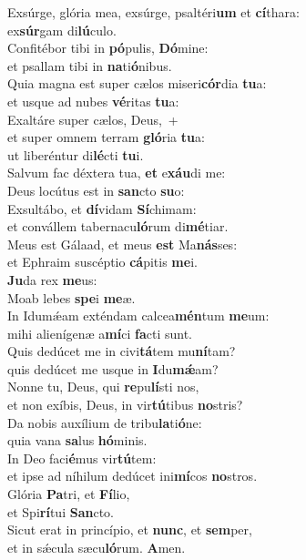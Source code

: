 \evenverse Exsúrge, glória mea, exsúrge, psaltéri\textbf{um} et \textbf{cí}thara:~\*\\
\evenverse ex\textbf{súr}gam di\textbf{lú}culo.\\
\oddverse Confitébor tibi in \textbf{pó}pulis, \textbf{Dó}mine:~\*\\
\oddverse et psallam tibi in \textbf{na}ti\textbf{ó}nibus.\\
\evenverse Quia magna est super cælos miseri\textbf{cór}dia \textbf{tu}a:~\*\\
\evenverse et usque ad nubes \textbf{vé}ritas \textbf{tu}a:\\
\oddverse Exaltáre super cælos, Deus,~+\\
\oddverse  et super omnem terram \textbf{gló}ria \textbf{tu}a:~\*\\
\oddverse ut liberéntur di\textbf{lé}cti \textbf{tu}i.\\
\evenverse Salvum fac déxtera tua, \textbf{et} e\textbf{xáu}di me:~\*\\
\evenverse Deus locútus est in \textbf{san}cto \textbf{su}o:\\
\oddverse Exsultábo, et \textbf{dí}vidam \textbf{Sí}chimam:~\*\\
\oddverse et convállem tabernacu\textbf{ló}rum di\textbf{mé}tiar.\\
\evenverse Meus est Gálaad, et meus \textbf{est} Ma\textbf{nás}ses:~\*\\
\evenverse et Ephraim suscéptio \textbf{cá}pitis \textbf{me}i.\\
\oddverse \textbf{Ju}da rex \textbf{me}us:~\*\\
\oddverse Moab lebes \textbf{spe}i \textbf{me}æ.\\
\evenverse In Idumǽam exténdam calcea\textbf{mén}tum \textbf{me}um:~\*\\
\evenverse mihi alienígenæ a\textbf{mí}ci \textbf{fa}cti sunt.\\
\oddverse Quis dedúcet me in civi\textbf{tá}tem mu\textbf{ní}tam?~\*\\
\oddverse quis dedúcet me usque in \textbf{I}du\textbf{mǽ}am?\\
\evenverse Nonne tu, Deus, qui \textbf{re}pu\textbf{lí}sti nos,~\*\\
\evenverse et non exíbis, Deus, in vir\textbf{tú}tibus \textbf{no}stris?\\
\oddverse Da nobis auxílium de tribu\textbf{la}ti\textbf{ó}ne:~\*\\
\oddverse quia vana \textbf{sa}lus \textbf{hó}minis.\\
\evenverse In Deo faci\textbf{é}mus vir\textbf{tú}tem:~\*\\
\evenverse et ipse ad níhilum dedúcet ini\textbf{mí}cos \textbf{no}stros.\\
\oddverse Glória \textbf{Pa}tri, et \textbf{Fí}lio,~\*\\
\oddverse et Spi\textbf{rí}tui \textbf{San}cto.\\
\evenverse Sicut erat in princípio, et \textbf{nunc}, et \textbf{sem}per,~\*\\
\evenverse et in sǽcula sæcu\textbf{ló}rum. \textbf{A}men.\\

